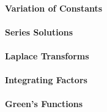 


\paragraph{Variation of Constants}


\paragraph{Series Solutions}

\paragraph{Laplace Transforms}

\paragraph{Integrating Factors}












\paragraph{Green's Functions}

